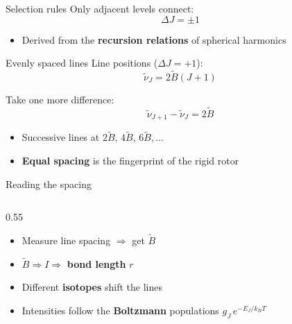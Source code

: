 \documentclass[
  ignorenonframetext,
  aspectratio=169,
  handout]{beamer}
\providecommand{\tightlist}{%
  \setlength{\itemsep}{0pt}\setlength{\parskip}{0pt}}
\begin{document}
\begin{frame}
\begin{block}{Selection rules}
Only adjacent levels connect: \[\boxed{\Delta J = \pm 1}\]

\begin{itemize}
\tightlist
\item
  Derived from the \textbf{recursion relations} of spherical harmonics
\end{itemize}
\end{block}

\begin{block}{Evenly spaced lines}
\protect{}\label{evenly-spaced-lines}
Line positions (\(\Delta J = +1\)): \[\tilde{\nu}_J = 2\tilde{B}(J+1)\]

Take one more difference:
\[\tilde{\nu}_{J+1} - \tilde{\nu}_J = 2\tilde{B}\]

\begin{itemize}
\tightlist
\item
  Successive lines at \(2\tilde{B},\,4\tilde{B},\,6\tilde{B},\dots\)
\end{itemize}

\begin{itemize}
\tightlist
\item
  \textbf{Equal spacing} is the fingerprint of the rigid rotor
\end{itemize}
\end{block}

\begin{block}{Reading the spacing}
\protect{}\label{reading-the-spacing}
\begin{columns}[T]
\begin{column}{0.55\linewidth}
\begin{itemize}
\tightlist
\item
  Measure line spacing \(\Rightarrow\) get \(\tilde{B}\)
\end{itemize}

\begin{itemize}
\tightlist
\item
  \(\tilde{B}\Rightarrow I\Rightarrow\) \textbf{bond length} \(r\)
\end{itemize}

\begin{itemize}
\tightlist
\item
  Different \textbf{isotopes} shift the lines
\end{itemize}

\begin{itemize}
\tightlist
\item
  Intensities follow the \textbf{Boltzmann} populations
  \(g_J\,e^{-E_J/k_BT}\)
\end{itemize}
\end{column}


\end{columns}
\end{block}
\end{frame}
\end{document}
